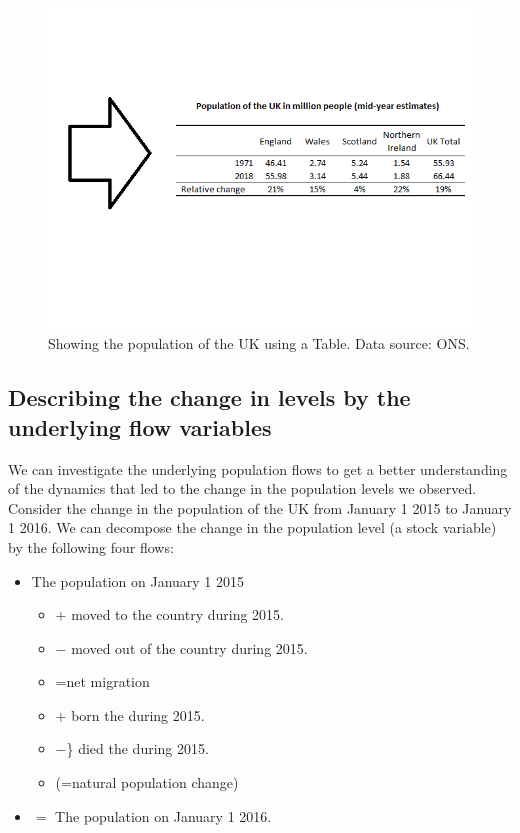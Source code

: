 \documentclass[]{book}
\providecommand{\tightlist}{%
  \setlength{\itemsep}{0pt}\setlength{\parskip}{0pt}}
\begin{document}
\begin{figure}

{\centering \includegraphics[width=0.5\linewidth]{_resources/chapter_people/tableb} 

}

\caption{Showing the population of the UK using a Table. Data source: ONS.}\label{fig:tableb}
\end{figure}

\hypertarget{describing-the-change-in-levels-by-the-underlying-flow-variables}{%
\subsection{Describing the change in levels by the underlying flow variables}\label{describing-the-change-in-levels-by-the-underlying-flow-variables}}

We can investigate the underlying population flows to get a better understanding of the dynamics that led to the change in the population levels we observed. Consider the change in the population of the UK from January 1 2015 to January 1 2016. We can decompose the change in the population level (a stock variable) by the following four flows:

\begin{itemize}
\tightlist
\item
  The population on January 1 2015

  \begin{itemize}
  \tightlist
  \item
    \(+\) moved to the country during 2015.
  \item
    \(-\) moved out of the country during 2015.
  \item
    =net migration
  \item
    \(+\) born the during 2015.
  \item
    \(-\)\} died the during 2015.
  \item
    (=natural population change)
  \end{itemize}
\item
  \(=\) The population on January 1 2016.
\end{itemize}
\end{document}
